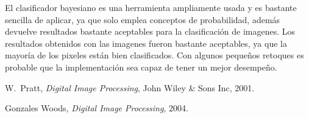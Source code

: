 \documentclass[10pt,journal,compsoc]{IEEEtran}\usepackage[T1]{fontenc}                              %
\begin{document}
El clasificador bayesiano es una herramienta ampliamente usada y es bastante sencilla de aplicar, ya que solo emplea conceptos de probabilidad, además devuelve resultados bastante aceptables para la clasificación de imagenes.
Los resultados obtenidos con las imagenes fueron bastante aceptables, ya que la mayoría de los pixeles están bien clasificados. Con algunos pequeños retoques es probable que la implementación sea capaz de tener un mejor desempeño.








%
%
%
\begin{thebibliography}{1}

W.~Pratt, \emph{Digital Image Processing}, John Wiley \& Sons Inc, 2001.

Gonzales Woods, \emph{Digital Image Processing}, 2004.

\end{thebibliography}


\end{document}
